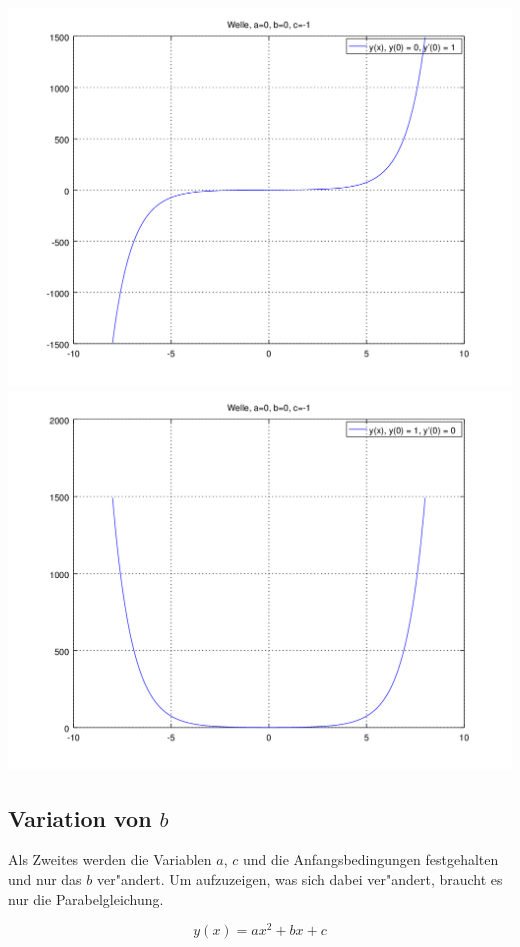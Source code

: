 \begin{refsection}
\noindent
\includegraphics[scale=0.35]{./wellen/octave/images/grundfunktionen/sinh.png}
\includegraphics[scale=0.35]{./wellen/octave/images/grundfunktionen/cosh.png}

\subsection{Variation von $b$}

Als Zweites werden die Variablen $a$, $c$ und die Anfangsbedingungen 
festgehalten und nur das $b$ ver"andert. Um aufzuzeigen, was sich dabei 
ver"andert, braucht es nur die Parabelgleichung.

\begin{equation*}
	y(x) = ax^2 + bx + c
\end{equation*}


\end{refsection}
